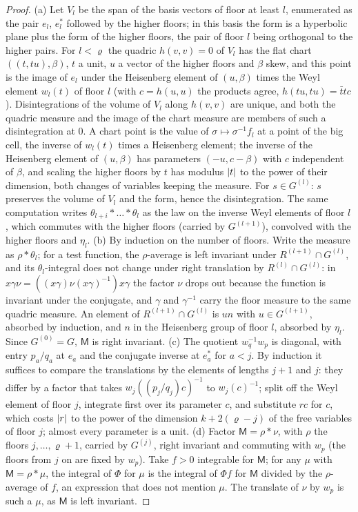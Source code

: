 \begin{proof}
(a) Let $V_l$ be the span of the basis vectors of floor at least $l$, enumerated as the pair $e_l$, $e^*_l$ followed by the higher floors; in this basis the form is a hyperbolic plane plus the form of the
higher floors, the pair of floor $l$ being orthogonal to the higher pairs. For $l<\varrho$ the quadric $h(v,v)=0$ of $V_l$ has the flat chart $((t,tu),\beta)$, $t$ a unit, $u$ a vector of the higher floors and $\beta$ skew,
and this point is the image of $e_l$ under the Heisenberg element of $(u,\beta)$ times the Weyl element $w_l(t)$ of floor $l$ (with $c=h(u,u)$ the products agree, $h(tu,tu)=\bar ttc$). Disintegrations of the volume of
$V_l$ along $h(v,v)$ are unique, and both the quadric measure and the image of the chart measure are members of such a disintegration at $0$. A chart point is the value of $\sigma\mapsto\sigma^{-1}f_l$ at a point of the
big cell, the inverse of $w_l(t)$ times a Heisenberg element; the inverse of the Heisenberg element of $(u,\beta)$ has parameters $(-u,c-\beta)$ with $c$ independent of $\beta$, and scaling the higher floors by $t$ has
modulus $\lvert t\rvert$ to the power of their dimension, both changes of variables keeping the measure. For $s\in G^{(l)}$: $s$ preserves the volume of $V_l$ and the form, hence the disintegration. The same computation
writes $\theta_{l+i}*\dots*\theta_l$ as the law on the inverse Weyl elements of floor $l$, which commutes with the higher floors (carried by $G^{(l+1)}$), convolved with the higher floors and $\eta_l$.
(b) By induction on the number of floors. Write the measure as $\rho*\theta_l$; for a test function, the $\rho$-average is left invariant under $R^{(l+1)}\cap G^{(l)}$, and its $\theta_l$-integral does not change under right
translation by $R^{(l)}\cap G^{(l)}$: in $x\gamma\nu=((x\gamma)\nu(x\gamma)^{-1})x\gamma$ the factor $\nu$ drops out because the function is invariant under the conjugate, and $\gamma$ and $\gamma^{-1}$ carry the floor measure to the same
quadric measure. An element of $R^{(l+1)}\cap G^{(l)}$ is $un$ with $u\in G^{(l+1)}$, absorbed by induction, and $n$ in the Heisenberg group of floor $l$, absorbed by $\eta_l$. Since $G^{(0)}=G$, $\mathsf M$ is right invariant.
(c) The quotient $w_q^{-1}w_p$ is diagonal, with entry $p_a/q_a$ at $e_a$ and the conjugate inverse at $e^*_a$ for $a<j$. By induction it suffices to compare the translations by the elements of lengths $j+1$ and $j$: they
differ by a factor that takes $w_j((p_j/q_j)c)^{-1}$ to $w_j(c)^{-1}$; split off the Weyl element of floor $j$, integrate first over its parameter $c$, and substitute $rc$ for $c$, which costs $\lvert r\rvert$ to the power of the
dimension $k+2(\varrho-j)$ of the free variables of floor $j$; almost every parameter is a unit.
(d) Factor $\mathsf M=\rho*\nu$, with $\rho$ the floors $j,\dots,\varrho+1$, carried by $G^{(j)}$, right invariant and commuting with $w_p$ (the floors from $j$ on are fixed by $w_p$). Take $f>0$ integrable for $\mathsf M$; for any $\mu$
with $\mathsf M=\rho*\mu$, the integral of $\Phi$ for $\mu$ is the integral of $\Phi f$ for $\mathsf M$ divided by the $\rho$-average of $f$, an expression that does not mention $\mu$. The translate of $\nu$ by $w_p$ is such a $\mu$, as
$\mathsf M$ is left invariant.
\end{proof}

